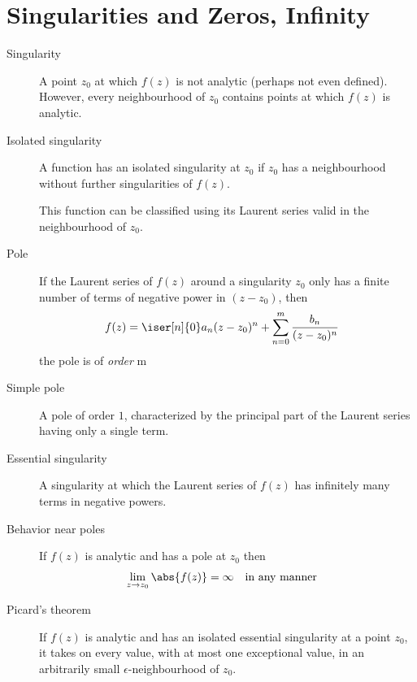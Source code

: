 \section{Singularities and Zeros, Infinity}

\begin{description}
    \item[Singularity] A point $ z_0 $ at which $ f(z) $ is not analytic (perhaps not
        even defined).
        However, every neighbourhood of $ z_0 $ contains points at which $ f(z) $ is
        analytic.

    \item[Isolated singularity] A function has an isolated singularity at $ z_0 $ if
        $ z_0 $ has a neighbourhood without further singularities of $ f(z) $. \par
        This function can be classified using its Laurent series valid in the
        neighbourhood of $ z_0 $.

    \item[Pole] If the Laurent series of $ f(z) $ around a singularity $ z_0 $
        only has a finite number of terms of negative power in $ (z - z_0) $, then
        \begin{align}
            f(z) & = \iser[n]{0} a_n (z - z_0)^n + \sum_{n=0}^{m}
            \frac{b_n}{(z - z_0)^n}
        \end{align}
        the pole is of \emph{order} m

    \item[Simple pole] A pole of order $ 1 $, characterized by the principal part of
        the Laurent series having only a single term.

    \item[Essential singularity] A singularity at which the Laurent series of
        $ f(z) $ has infinitely many terms in negative powers.

    \item[Behavior near poles] If $ f(z) $ is analytic and has a pole at $ z_0 $ then
        \begin{align}
            \lim_{z \to z_0} \abs{f(z)} & = \infty &  & \text{in any manner}
        \end{align}

    \item[Picard's theorem] If $ f(z) $ is analytic and has an isolated essential
        singularity at a point $ z_0 $, it takes on every value, with at most one
        exceptional value, in an arbitrarily small $ \epsilon $-neighbourhood of $ z_0 $.


\end{description}
